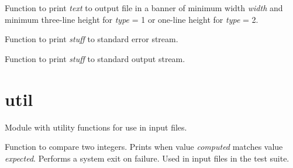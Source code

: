 \documentclass[letterpaper,10pt,english]{sphinxmanual}
\begin{document}

\begin{fulllineitems}
\label{index:text.banner}
Function to print \emph{text} to output file in a banner of
minimum width \emph{width} and minimum three-line height for
\emph{type} = 1 or one-line height for \emph{type} = 2.

\end{fulllineitems}


\begin{fulllineitems}
\label{index:text.print_stderr}
Function to print \emph{stuff} to standard error stream.

\end{fulllineitems}


\begin{fulllineitems}
\label{index:text.print_stdout}
Function to print \emph{stuff} to standard output stream.

\end{fulllineitems}



\section{util}
\label{index:util}\label{index:module-util}
Module with utility functions for use in input files.

\begin{fulllineitems}
\label{index:util.compare_integers}
Function to compare two integers. Prints {\hyperref[index:util.success]{}}
when value \emph{computed} matches value \emph{expected}.
Performs a system exit on failure. Used in input files in the test suite.

\end{fulllineitems}

\end{document}
